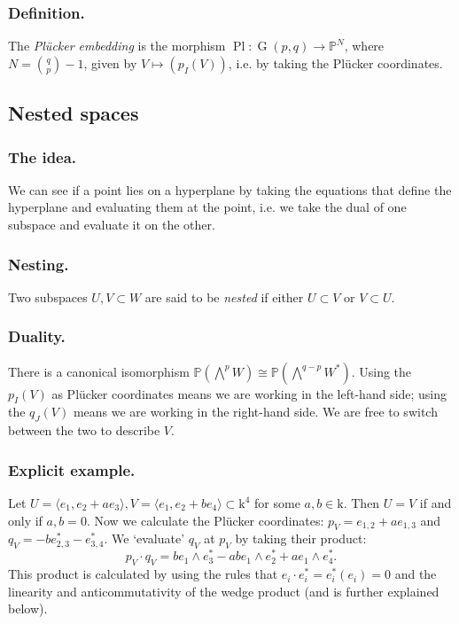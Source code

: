 \documentclass[10pt]{article}
\numberwithin{equation}{subsubsection}
\DeclareMathOperator{\G}{G}
\DeclareMathOperator{\Pl}{Pl}
\renewcommand{\P}{\mathbb{P}}
\renewcommand{\k}{\mathrm{k}}
\begin{document}
            \subsubsection{Definition.} The \textit{Plücker embedding} is the morphism $\Pl\colon\G(p,q)\to\P^{N}$, where $N=\binom{q}{p}-1$, given by $V\mapsto(p_I(V))$, i.e. by taking the Plücker coordinates.
        
        \subsection{Nested spaces}
        
            \subsubsection{The idea.} We can see if a point lies on a hyperplane by taking the equations that define the hyperplane and evaluating them at the point, i.e. we take the dual of one subspace and evaluate it on the other.
            
            \subsubsection{Nesting.} Two subspaces $U,V\subset W$ are said to be \textit{nested} if either $U\subset V$ or $V\subset U$.
        
            \subsubsection{Duality.} There is a canonical isomorphism $\P\left(\bigwedge^p W\right)\cong\P\left(\bigwedge^{q-p} W^*\right)$. Using the $p_I(V)$ as Plücker coordinates means we are working in the left-hand side; using the $q_J(V)$ means we are working in the right-hand side. We are free to switch between the two to describe $V$.
            
            \subsubsection{Explicit example.} Let $U = \langle e_1,e_2+ae_3\rangle,V = \langle e_1,e_2+be_4\rangle\subset\k^4$ for some $a,b\in\k$. Then $U=V$ if and only if $a,b=0$. Now we calculate the Plücker coordinates: $p_V = e_{1,2}+ae_{1,3}$ and $q_V = -be_{2,3}^*-e_{3,4}^*$. We `evaluate' $q_V$ at $p_V$ by taking their product: \[p_V\cdot q_V = be_1\wedge e_3^*-abe_1\wedge e_2^*+ae_1\wedge e_4^*.\] This product is calculated by using the rules that $e_i\cdot e_i^* = e_i^*(e_i) = 0$ and the linearity and anticommutativity of the wedge product (and is further explained below).
            
\end{document}
